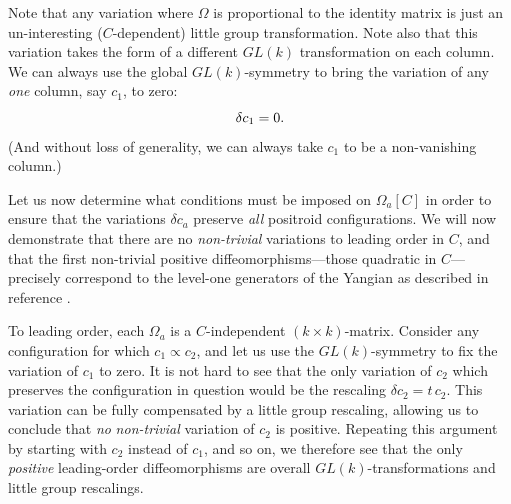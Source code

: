\documentclass[12pt,hyperref,compress]{JHEP3}
\newcommand{\eq}[1]{\begin{equation}#1\end{equation}}
\begin{document}
{Note that any variation where $\Omega$ is proportional to the identity matrix is just an un-interesting ($C$-dependent) little group transformation. Note also that this variation takes the form of a different $GL(k)$ transformation on each column. We can always use the global $GL(k)$-symmetry to bring the variation of any {\it one} column, say $c_1$, to zero: \vspace{-.2cm}\eq{\delta c_1=0.\vspace{-.2cm}} (And without loss of generality, we can always take  $c_1$ to be a non-vanishing column.)

Let us now determine what conditions must be imposed on $\Omega_a[C]$ in order to ensure that the variations $\delta c_a$ preserve {\it all} positroid configurations. We will now demonstrate that there are no {\it non-trivial} variations to leading order in $C$, and that the first non-trivial positive diffeomorphisms---those quadratic in $C$---precisely correspond to the level-one generators of the Yangian as described in reference \cite{Drummond:2010uq}.

To leading order, each $\Omega_a$ is a $C$-independent $(k\!\times\!k)$-matrix. Consider any configuration for which $c_1\!\propto\!c_2$, and let us use the $GL(k)$-symmetry to fix the variation of $c_1$ to zero. It is not hard to see that the only variation of $c_2$ which preserves the configuration in question would be the rescaling $\delta c_2=t\,c_2$. This variation can be fully compensated by a little group rescaling, allowing us to conclude that {\it no} {\it non-trivial} variation of $c_2$ is positive. Repeating this argument by starting with $c_2$ instead of $c_1$, and so on, we therefore see that the only {\it positive} leading-order diffeomorphisms are overall $GL(k)$-transformations and little group rescalings.

}
\end{document}
